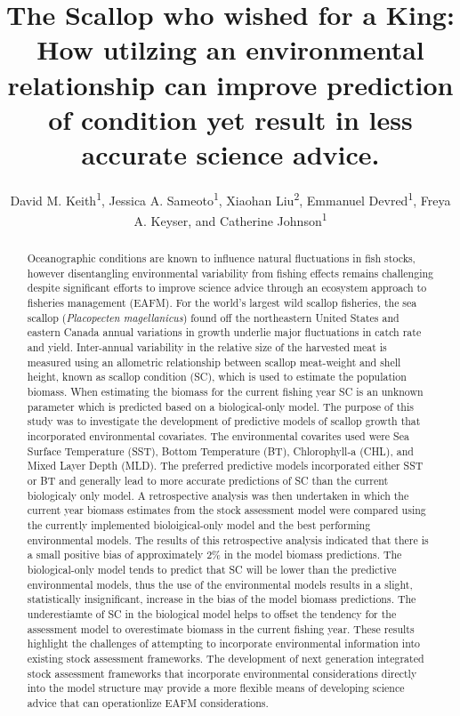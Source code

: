\documentclass[
]{article}
\title{The Scallop who wished for a King: How utilzing an environmental relationship can improve prediction of condition yet result in less accurate science advice.}
\author{David M. Keith\textsuperscript{1},
Jessica A. Sameoto\textsuperscript{1},
Xiaohan Liu\textsuperscript{2},
Emmanuel Devred\textsuperscript{1},
Freya A. Keyser, and
Catherine Johnson\textsuperscript{1}}
\date{}
\begin{document}
\maketitle
\begin{abstract}
Oceanographic conditions are known to influence natural fluctuations in fish stocks, however disentangling environmental variability from fishing effects remains challenging despite significant efforts to improve science advice through an ecosystem approach to fisheries management (EAFM). For the world's largest wild scallop fisheries, the sea scallop (\emph{Placopecten magellanicus}) found off the northeastern United States and eastern Canada annual variations in growth underlie major fluctuations in catch rate and yield. Inter-annual variability in the relative size of the harvested meat is measured using an allometric relationship between scallop meat-weight and shell height, known as scallop condition (SC), which is used to estimate the population biomass. When estimating the biomass for the current fishing year SC is an unknown parameter which is predicted based on a biological-only model. The purpose of this study was to investigate the development of predictive models of scallop growth that incorporated environmental covariates. The environmental covarites used were Sea Surface Temperature (SST), Bottom Temperature (BT), Chlorophyll-a (CHL), and Mixed Layer Depth (MLD). The preferred predictive models incorporated either SST or BT and generally lead to more accurate predictions of SC than the current biologicaly only model. A retrospective analysis was then undertaken in which the current year biomass estimates from the stock assessment model were compared using the currently implemented bioloigical-only model and the best performing environmental models. The results of this retrospective analysis indicated that there is a small positive bias of approximately 2\% in the model biomass predictions. The biological-only model tends to predict that SC will be lower than the predictive environmental models, thus the use of the environmental models results in a slight, statistically insignificant, increase in the bias of the model biomass predictions. The underestiamte of SC in the biological model helps to offset the tendency for the assessment model to overestimate biomass in the current fishing year. These results highlight the challenges of attempting to incorporate environmental information into existing stock assessment frameworks. The development of next generation integrated stock assessment frameworks that incorporate environmental considerations directly into the model structure may provide a more flexible means of developing science advice that can operationlize EAFM considerations.
\end{abstract}
\end{document}
